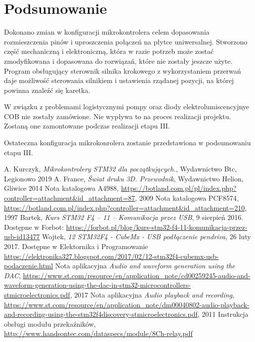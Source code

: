 \documentclass[10pt, a4paper]{article}
\begin{document}
\section{Podsumowanie}

Dokonano zmian w konfiguracji mikrokontrolera celem dopasowania rozmieszczenia pinów i uproszczenia połączeń na płytce uniwersalnej. Stworzono część mechaniczną i elektroniczną, która w razie potrzeb może zostać zmodyfikowana i dopasowana do rozwiązań, które nie zostały jeszcze użyte. Program obsługujący sterownik silnika krokowego z wykorzystaniem przerwań daje możliwość sterowania silnikiem i ustawienia rządanej pozycji, na której powinna znaleźć się karetka.

W związku z problemami logistycznymi pompy oraz diody elektrolumiscencyjnye COB nie zostały zamówione. Nie wypływa to na proces realizacji projektu. Zostaną one zamontowane podczas realizacji etapu III. 

Ostateczna konfiguracja mikrokonrolera zostanie przedstawiona w podsumowaniu etapu III. 


\newpage
%
%
\begin{thebibliography}{9}

    A. Kurczyk, \emph{Mikrokontrolery STM32 dla początkujących.}, Wydawnictwo Btc, Legionowo 2019
    A. France, \emph{Świat druku 3D. Przewodnik}, Wydawnictwo Helion, Gliwice 2014
    Nota katalogowa A4988, \url{https://botland.com.pl/pl/index.php?controller=attachment&id_attachment=87}, 2009
    Nota katalogowa PCF8574, \url{https://botland.com.pl/index.php?controller=attachment&id_attachment=210}, 1997
    Bartek, \emph{Kurs STM32 F4 – 11 – Komunikacja przez USB}, 9 sierpień 2016. Dostępne w Forbot: \url{https://forbot.pl/blog/kurs-stm32-f4-11-komunikacja-przez-usb-id13477}
    Wojtek, \emph{12 STM32F4 - CubeMx - USB podłączenie pendriva}, 26 luty 2017. Dostępne w Elektornika i Programowanie \url{https://elektronika327.blogspot.com/2017/02/12-stm32f4-cubemx-usb-podaczenie.html}
    Nota aplikacyjna \emph{Audio and waveform generation using the DAC}, \url{https://www.st.com/resource/en/application_note/cd00259245-audio-and-waveform-generation-using-the-dac-in-stm32-microcontrollers-stmicroelectronics.pdf}, 2017
    Nota aplikacyjna \emph{Audio playback and recording},
    \url{https://www.st.com/resource/en/application_note/dm00040802-audio-playback-and-recording-using-the-stm32f4discovery-stmicroelectronics.pdf}, 2011
    Instrukcja obsługi modułu przekaźników, \url{http://www.handsontec.com/dataspecs/module/8Ch-relay.pdf}
\end{thebibliography}
\end{document}
